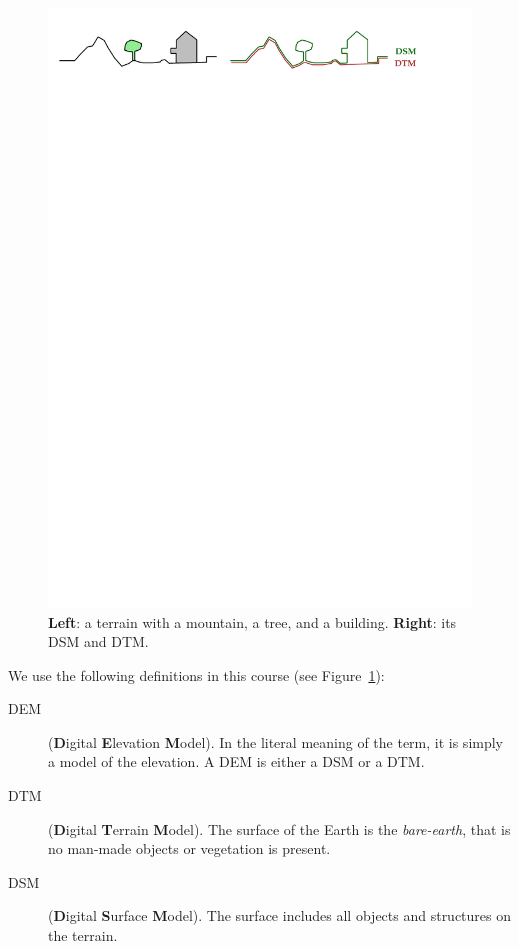 \begin{figure}
  \centering
  \includegraphics[width=0.95\linewidth]{figs/dtmdsm}
  \caption{\textbf{Left}: a terrain with a mountain, a tree, and a building. \textbf{Right}: its DSM and DTM.}
\label{fig:dtmdsm}
\end{figure}
We use the following definitions in this course (see Figure~\ref{fig:dtmdsm}):
\begin{description}
  \item[DEM] (\textbf{D}igital \textbf{E}levation \textbf{M}odel). In the literal meaning of the term, it is simply a model of the elevation. A DEM is either a DSM or a DTM\@. 
  \item[DTM] (\textbf{D}igital \textbf{T}errain \textbf{M}odel). The surface of the Earth is the \emph{bare-earth}, that is no man-made objects or vegetation is present. 
  \item[DSM] (\textbf{D}igital \textbf{S}urface \textbf{M}odel). The surface includes all objects and structures on the terrain.
\end{description}

